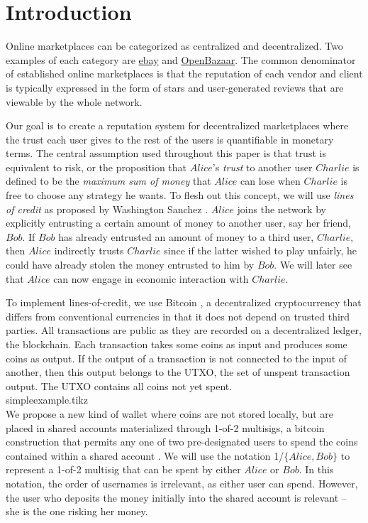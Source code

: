 \section{Introduction}
  Online marketplaces can be categorized as centralized and decentralized.
  Two examples of each category are \href{http://www.ebay.com}{ebay} and \href{https://openbazaar.org/}{OpenBazaar}.
  The common denominator of established online marketplaces is that the reputation of each vendor and client is typically
  expressed in the form of stars and user-generated reviews that are viewable by the whole network.

  Our goal is to create a reputation system for decentralized marketplaces where the trust each user gives to the rest of
  the users is quantifiable in monetary terms. The central assumption used throughout this paper
  is that trust is equivalent to risk, or the proposition that $Alice$'s \textit{trust} to another user $Charlie$ is defined
  to be the \textit{maximum sum of money} that $Alice$ can lose when $Charlie$ is free to choose any strategy he wants. To
  flesh out this concept, we will use \textit{lines of credit} as proposed by Washington Sanchez \cite{loc}. $Alice$ joins
  the network by explicitly entrusting a certain amount of money to another user, say her friend, $Bob$. If $Bob$ has already
  entrusted an amount of money to a third user, $Charlie$, then $Alice$ indirectly trusts $Charlie$ since if the latter
  wished to play unfairly, he could have already stolen the money entrusted to him by $Bob$. We will later see that $Alice$
  can now engage in economic interaction with $Charlie$.

  To implement lines-of-credit, we use Bitcoin \cite{bitcoin}, a decentralized cryptocurrency that differs from conventional
  currencies in that it does not depend on trusted third parties. All transactions are public as they are recorded on a
  decentralized ledger, the blockchain. Each transaction takes some coins as input and produces some coins as output. If the
  output of a transaction is not connected to the input of another, then this output belongs to the UTXO, the set of unspent
  transaction output. The UTXO contains all coins not yet spent.
  \medskip \ \\
  {simpleexample.tikz} \smallskip \ \\
  We propose a new kind of wallet where coins are not stored locally, but are placed in shared accounts materialized through
  1-of-2 multisigs, a bitcoin construction that permits any one of two pre-designated users to spend the coins contained
  within a shared account \cite{masteringbitcoin}. We will use the notation 1/$\{Alice, Bob\}$ to represent a 1-of-2
  multisig that can be spent by either $Alice$ or $Bob$. In this notation, the order of usernames is irrelevant, as either
  user can spend. However, the user who deposits the money initially into the shared account is relevant -- she is the one
  risking her money.

